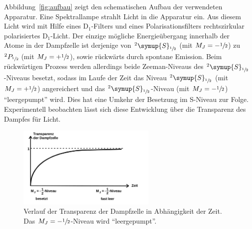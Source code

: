Abbildung~\ref{fig:aufbau} zeigt den schematischen Aufbau der verwendeten
Apparatur. Eine Spektrallampe strahlt Licht in die Apparatur ein. Aus diesem
Licht wird mit Hilfe eines $\text{D}_1$-Filters und eines Polarisationsfilters
rechtszirkular polarisiertes $\text{D}_1$-Licht. Der einzige mögliche
Energieübergang innerhalb der Atome in der Dampfzelle ist derjenige von
$^2\symup{S}_{\sfrac{1}{2}}$ (mit $M_J=-\sfrac{1}{2}$) zu
$^2P_{\sfrac{1}{2}}$ (mit $M_J=+\sfrac{1}{2}$), sowie rückwärts durch
spontane Emission. Beim rückwärtigen Prozess werden allerdings beide
Zeeman-Niveaus des $^2\symup{S}_{\sfrac{1}{2}}$-Niveaus besetzt, sodass im
Laufe der Zeit das Niveau $^2\symup{S}_{\sfrac{1}{2}}$ (mit
$M_J=+\sfrac{1}{2}$) angereichert und das
$^2\symup{S}_{\sfrac{1}{2}}$-Niveau (mit $M_J=-\sfrac{1}{2}$)
\enquote{leergepumpt} wird. Dies hat eine Umkehr der Besetzung im S-Niveau zur
Folge. Experimentell beobachten lässt sich diese Entwicklung über die
Transparenz des Dampfes für Licht.
%
\begin{figure}[htb]
  \centering
  \includegraphics[width=0.6\textwidth]{figures/transparenz.pdf}
  \caption{Verlauf der Transparenz der Dampfzelle in Abhängigkeit der Zeit. Das $M_J=-\sfrac{1}{2}$-Niveau wird \enquote{leergepumpt}\cite{V21}.}
  \label{fig:transparenz}
\end{figure}

